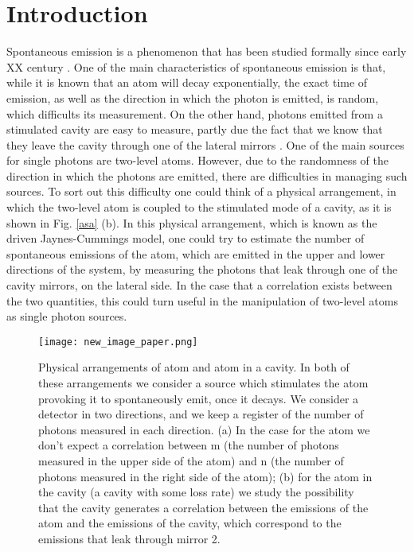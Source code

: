 \documentclass[conference]{IEEEtran}
\begin{document}
\section{Introduction}
Spontaneous emission is a phenomenon that has been studied formally since early XX century \cite{10.2307/94746, 1917PhyZ...18..121E}. One of the main characteristics of spontaneous emission is that, while it is known that an atom will decay exponentially, the exact time of emission, as well as the direction in  which the photon is emitted, is random, which difficults its measurement. On the other hand, photons emitted from a stimulated cavity are easy to measure, partly due the fact that we know that they leave the cavity through one of the lateral mirrors \cite{326305, doi:10.1063/1.113345}. One of the main sources for single photons are two-level atoms. However, due to the randomness of the direction in which the photons are emitted, there are difficulties in managing such sources. To sort out this difficulty one could think of a physical arrangement, in which the two-level atom is coupled to the stimulated mode of a cavity, as it is shown in Fig. \ref{asa} (b). In this physical arrangement, which is known as the driven Jaynes-Cummings model, one could try to estimate the number of spontaneous emissions of the atom, which are emitted in the upper and lower directions of the system, by measuring the photons that leak through one of the cavity mirrors, on the lateral side. In the case that a correlation exists between the two quantities, this could turn useful in the manipulation of two-level atoms as single photon sources. 
\begin{center}
\begin{figure*}\label{asa}
\begin{center}
\texttt{[image: new\_image\_paper.png]}
\caption{\small{Physical arrangements of atom and atom in a cavity. In both of these arrangements we consider a source which stimulates the atom provoking it to spontaneously emit, once it decays. We consider a detector in two directions, and we keep a register of the number of photons measured in each direction. (a) In the case for the atom we don't expect a correlation between m (the number of photons measured in the upper side of the atom) and n (the number of photons measured in the right side of the atom); (b) for the atom in the cavity (a cavity with some loss rate) we study the possibility that the cavity generates a correlation between the emissions of the atom and the emissions of the cavity, which correspond to the emissions that leak through mirror 2.}} \label{probdisult}
\end{center}
\end{figure*}
\end{center}
\end{document}
